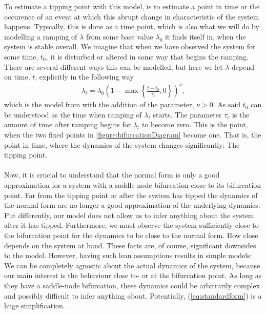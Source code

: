 To estimate a tipping point with this model, is to estimate a point in time or the occurence of an event at which this abrupt change in characteristic of the system happens. Typically, this is done as a time point, which is also what we will do by modelling a ramping of $\lambda$ from some base value $\lambda_0$ it finds itself in, when the system is stable overall. We imagine that when we have observed the system for some time, $t_0$, it is disturbed or altered in some way that begins the ramping. There are several different ways this can be modelled, but here we let $\lambda$ depend on time, $t$, explicitly in the following way
\begin{align}
    \lambda_t = \lambda_0\left(1 - \max\left\{\frac{t - t_0}{\tau_c},0\right\}\right)^\nu, \label{eq:lambdaRampDefinition}
\end{align} 
which is the model from \cite[equation (2)]{Ditlevsen2023} with the addition of the parameter, $\nu>0$. As said $t_0$ can be understood as the time when ramping of $\lambda_t$ starts. The parameter $\tau_c$ is the amount of time after ramping begins for $\lambda_t$ to become zero. This is the point, when the two fixed points in \ref{figure:bifurcationDiagram} become one. That is, the point in time, where the dynamics of the system changes significantly: The tipping point. \\\\
Now, it is crucial to understand that the normal form is only a good approximation for a system with a saddle-node bifurcation close to its bifurcation point. Far from the tipping point or after the system has tipped the dynamics of the normal form are no longer a good approximation of the underlying dynamics. Put differently, our model does not allow us to infer anything about the system after it has tipped. Furthermore, we must observe the system sufficiently close to the bifurcation point for the dynamics to be close to the normal form. How close depends on the system at hand. These facts are, of course, significant downsides to the model. However, having such lean assumptions results in simple models: We can be completely agnostic about the actual dynamics of the system, because our main interest is the behaviour close to- or at the bifurcation point. As long as they have a saddle-node bifurcation, these dynamics could be arbitrarily complex and possibly difficult to infer anything about. Potentially, (\ref{eq:standardform}) is a huge simplification.
